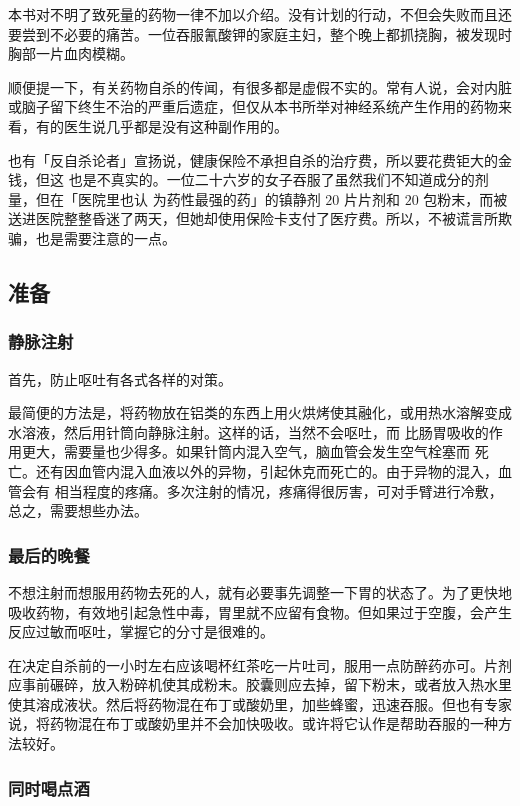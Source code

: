 \documentclass[UTF8]{ctexart}
\begin{document}
本书对不明了致死量的药物一律不加以介绍。没有计划的行动，不但会失败而且还要尝到不必要的痛苦。一位吞服氰酸钾的家庭主妇，整个晚上都抓挠胸，被发现时胸部一片血肉模糊。

顺便提一下，有关药物自杀的传闻，有很多都是虚假不实的。常有人说，会对内脏或脑子留下终生不治的严重后遗症，但仅从本书所举对神经系统产生作用的药物来看，有的医生说几乎都是没有这种副作用的。

也有「反自杀论者」宣扬说，健康保险不承担自杀的治疗费，所以要花费钜大的金钱，但这 也是不真实的。一位二十六岁的女子吞服了虽然我们不知道成分的剂量，但在「医院里也认 为药性最强的药」的镇静剂 $20$ 片片剂和 $20$ 包粉末，而被送进医院整整昏迷了两天，但她却使用保险卡支付了医疗费。所以，不被谎言所欺骗，也是需要注意的一点。

\subsection{准备}

\subsubsection*{静脉注射}

首先，防止呕吐有各式各样的对策。

最简便的方法是，将药物放在铝类的东西上用火烘烤使其融化，或用热水溶解变成水溶液，然后用针筒向静脉注射。这样的话，当然不会呕吐，而 比肠胃吸收的作用更大，需要量也少得多。如果针筒内混入空气，脑血管会发生空气栓塞而 死亡。还有因血管内混入血液以外的异物，引起休克而死亡的。由于异物的混入，血管会有 相当程度的疼痛。多次注射的情况，疼痛得很厉害，可对手臂进行冷敷，总之，需要想些办法。

\subsubsection*{最后的晚餐}

不想注射而想服用药物去死的人，就有必要事先调整一下胃的状态了。为了更快地吸收药物，有效地引起急性中毒，胃里就不应留有食物。但如果过于空腹，会产生反应过敏而呕吐，掌握它的分寸是很难的。

在决定自杀前的一小时左右应该喝杯红茶吃一片吐司，服用一点防醉药亦可。片剂应事前碾碎，放入粉碎机使其成粉末。胶囊则应去掉，留下粉末，或者放入热水里使其溶成液状。然后将药物混在布丁或酸奶里，加些蜂蜜，迅速吞服。但也有专家说，将药物混在布丁或酸奶里并不会加快吸收。或许将它认作是帮助吞服的一种方法较好。

\subsubsection*{同时喝点酒}
\end{document}
